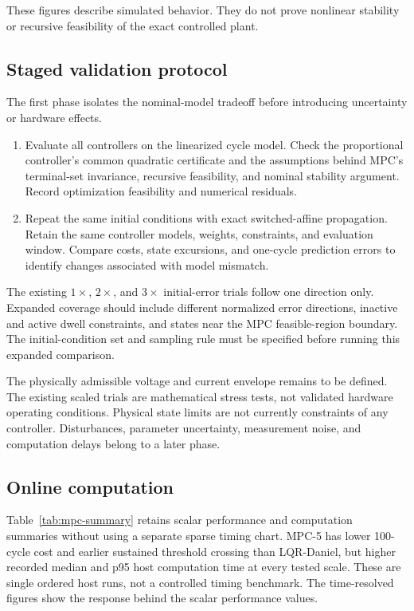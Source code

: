 \documentclass[11pt,a4paper]{article}
\begin{document}
These figures describe simulated behavior. They do not prove nonlinear
stability or recursive feasibility of the exact controlled plant.

\subsection{Staged validation protocol}

The first phase isolates the nominal-model tradeoff before introducing
uncertainty or hardware effects.
\begin{enumerate}
    \item Evaluate all controllers on the linearized cycle model. Check the
    proportional controller's common quadratic certificate and the assumptions
    behind MPC's terminal-set invariance, recursive feasibility, and nominal
    stability argument. Record optimization feasibility and numerical residuals.
    \item Repeat the same initial conditions with exact switched-affine
    propagation. Retain the same controller models, weights, constraints, and
    evaluation window. Compare costs, state excursions, and one-cycle prediction
    errors to identify changes associated with model mismatch.
\end{enumerate}
The existing $1\times$, $2\times$, and $3\times$ initial-error trials follow
one direction only. Expanded coverage should include different normalized
error directions, inactive and active dwell constraints, and states near the
MPC feasible-region boundary. The initial-condition set and sampling rule must
be specified before running this expanded comparison.

The physically admissible voltage and current envelope remains to be defined.
The existing scaled trials are mathematical stress tests, not validated
hardware operating conditions. Physical state limits are not currently
constraints of any controller. Disturbances, parameter uncertainty,
measurement noise, and computation delays belong to a later phase.

\subsection{Online computation}

Table~\ref{tab:mpc-summary} retains scalar performance and computation
summaries without using a separate sparse timing chart. MPC-5 has lower
100-cycle cost and earlier sustained threshold crossing than LQR-Daniel, but
higher recorded median and p95 host computation time at every tested scale.
These are single ordered host runs, not a controlled timing benchmark.
The time-resolved figures show the response behind the scalar performance values.
\end{document}
